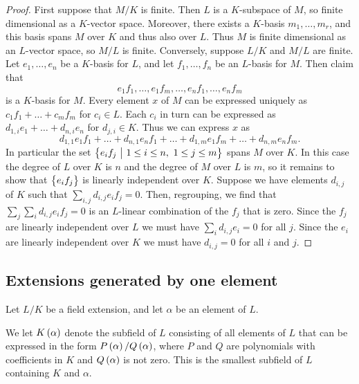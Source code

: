 \begin{proof}
First suppose that $ M / K $ is finite. Then $ L $ is a $ K $-subspace of $ M $, so finite dimensional as a $ K $-vector space. Moreover, there exists a $ K $-basis $ m_1, \dots, m_r $, and this basis spans $ M $ over $ K $ and thus also over $ L $. Thus $ M $ is finite dimensional as an $ L $-vector space, so $ M / L $ is finite. Conversely, suppose $ L / K $ and $ M / L $ are finite. Let $ e_1, \dots, e_n $ be a $ K $-basis for $ L $, and let $ f_1, \dots, f_n $ be an $ L $-basis for $ M $. Then claim that
$$ e_1f_1, \dots, e_1f_m, \dots, e_nf_1, \dots, e_nf_m $$
is a $ K $-basis for $ M $. Every element $ x $ of $ M $ can be expressed uniquely as $ c_1f_1 + \dots + c_mf_m $ for $ c_i \in L $. Each $ c_i $ in turn can be expressed as $ d_{1, i}e_1 + \dots + d_{n, i}e_n $ for $ d_{j, i} \in K $. Thus we can express $ x $ as
$$ d_{1, 1}e_1f_1 + \dots + d_{n, 1}e_nf_1 + \dots + d_{1, m}e_1f_m + \dots + d_{n, m}e_nf_m. $$
In particular the set $ \cbr{e_if_j \st 1 \le i \le n, \ 1 \le j \le m} $ spans $ M $ over $ K $. In this case the degree of $ L $ over $ K $ is $ n $ and the degree of $ M $ over $ L $ is $ m $, so it remains to show that $ \cbr{e_if_j} $ is linearly independent over $ K $. Suppose we have elements $ d_{i, j} $ of $ K $ such that $ \sum_{i, j} d_{i, j}e_if_j = 0 $. Then, regrouping, we find that $ \sum_j \sum_i d_{i, j}e_if_j = 0 $ is an $ L $-linear combination of the $ f_j $ that is zero. Since the $ f_j $ are linearly independent over $ L $ we must have $ \sum_i d_{i, j}e_i = 0 $ for all $ j $. Since the $ e_i $ are linearly independent over $ K $ we must have $ d_{i, j} = 0 $ for all $ i $ and $ j $.
\end{proof}

\pagebreak

\subsection{Extensions generated by one element}


Let $ L / K $ be a field extension, and let $ \alpha $ be an element of $ L $.

\begin{definition}
We let $ K\br{\alpha} $ denote the subfield of $ L $ consisting of all elements of $ L $ that can be expressed in the form $ P\br{\alpha} / Q\br{\alpha} $, where $ P $ and $ Q $ are polynomials with coefficients in $ K $ and $ Q\br{\alpha} $ is not zero. This is the smallest subfield of $ L $ containing $ K $ and $ \alpha $.
\end{definition}

